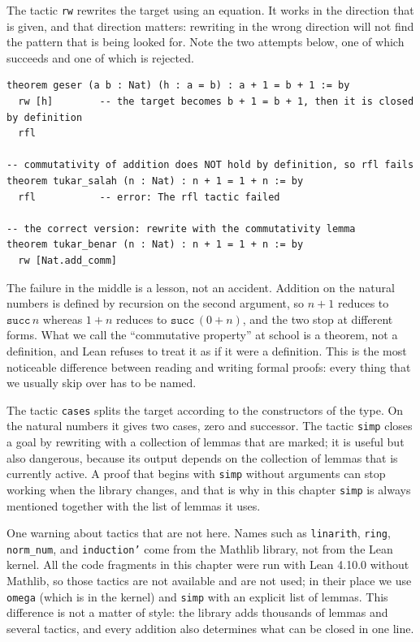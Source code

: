 The tactic \texttt{rw} rewrites the target using an equation. It works in the direction that is
given, and that direction matters: rewriting in the wrong direction will not find the pattern that
is being looked for. Note the two attempts below, one of which succeeds and one of which is
rejected.

\begin{verbatim}
theorem geser (a b : Nat) (h : a = b) : a + 1 = b + 1 := by
  rw [h]        -- the target becomes b + 1 = b + 1, then it is closed by definition
  rfl

-- commutativity of addition does NOT hold by definition, so rfl fails
theorem tukar_salah (n : Nat) : n + 1 = 1 + n := by
  rfl           -- error: The rfl tactic failed

-- the correct version: rewrite with the commutativity lemma
theorem tukar_benar (n : Nat) : n + 1 = 1 + n := by
  rw [Nat.add_comm]
\end{verbatim}

The failure in the middle is a lesson, not an accident. Addition on the natural numbers is defined
by recursion on the second argument, so $n+1$ reduces to $\mathtt{succ}\,n$ whereas $1+n$ reduces to
$\mathtt{succ}\,(0+n)$, and the two stop at different forms. What we call the ``commutative
property'' at school is a theorem, not a definition, and Lean refuses to treat it as if it were a
definition. This is the most noticeable difference between reading and writing formal proofs: every
thing that we usually skip over has to be named.

The tactic \texttt{cases} splits the target according to the constructors of the type. On the
natural numbers it gives two cases, zero and successor. The tactic \texttt{simp} closes a goal by
rewriting with a collection of lemmas that are marked; it is useful but also dangerous, because its
output depends on the collection of lemmas that is currently active. A proof that begins with
\texttt{simp} without arguments can stop working when the library changes, and that is why in this
chapter \texttt{simp} is always mentioned together with the list of lemmas it uses.

One warning about tactics that are not here. Names such as \texttt{linarith}, \texttt{ring},
\texttt{norm\_num}, and \texttt{induction'} come from the Mathlib library, not from the Lean kernel.
All the code fragments in this chapter were run with Lean 4.10.0 without Mathlib, so those tactics
are not available and are not used; in their place we use \texttt{omega} (which is in the kernel)
and \texttt{simp} with an explicit list of lemmas. This difference is not a matter of style: the
library adds thousands of lemmas and several tactics, and every addition also determines what can be
closed in one line.

